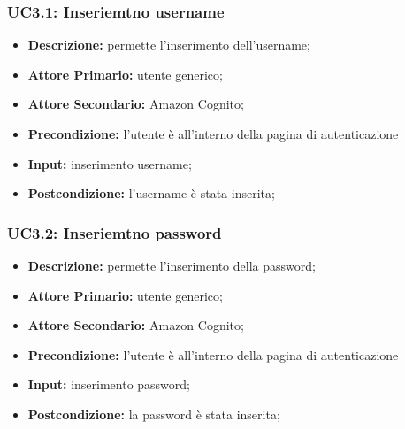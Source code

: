 \subsubsection{UC3.1: Inseriemtno username}
\begin{itemize}
    \item \textbf{Descrizione:} permette l'inserimento dell'username;
    \item \textbf{Attore Primario:} utente generico;
    \item \textbf{Attore Secondario:} Amazon Cognito;
    \item \textbf{Precondizione:} l'utente è all'interno della pagina di autenticazione
    \item \textbf{Input:} inserimento username;
    \item \textbf{Postcondizione:} l'username è stata inserita;
\end{itemize}
\subsubsection{UC3.2: Inseriemtno password}
\begin{itemize}
    \item \textbf{Descrizione:} permette l'inserimento della password;
    \item \textbf{Attore Primario:} utente generico;
    \item \textbf{Attore Secondario:} Amazon Cognito;
    \item \textbf{Precondizione:} l'utente è all'interno della pagina di autenticazione
    \item \textbf{Input:} inserimento password;
    \item \textbf{Postcondizione:} la password è stata inserita;
\end{itemize}
